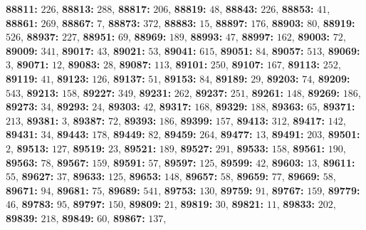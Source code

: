 \textsf{\bfseries 88811:} $226$, \textsf{\bfseries 88813:} $288$, \textsf{\bfseries 88817:} $206$, \textsf{\bfseries 88819:} $48$, \textsf{\bfseries 88843:} $226$, \textsf{\bfseries 88853:} $41$, \textsf{\bfseries 88861:} $269$, \textsf{\bfseries 88867:} $7$, \textsf{\bfseries 88873:} $372$, \textsf{\bfseries 88883:} $15$, \textsf{\bfseries 88897:} $176$, \textsf{\bfseries 88903:} $80$, \textsf{\bfseries 88919:} $526$, \textsf{\bfseries 88937:} $227$, \textsf{\bfseries 88951:} $69$, \textsf{\bfseries 88969:} $189$, \textsf{\bfseries 88993:} $47$, \textsf{\bfseries 88997:} $162$, \textsf{\bfseries 89003:} $72$, \textsf{\bfseries 89009:} $341$, \textsf{\bfseries 89017:} $43$, \textsf{\bfseries 89021:} $53$, \textsf{\bfseries 89041:} $615$, \textsf{\bfseries 89051:} $84$, \textsf{\bfseries 89057:} $513$, \textsf{\bfseries 89069:} $3$, \textsf{\bfseries 89071:} $12$, \textsf{\bfseries 89083:} $28$, \textsf{\bfseries 89087:} $113$, \textsf{\bfseries 89101:} $250$, \textsf{\bfseries 89107:} $167$, \textsf{\bfseries 89113:} $252$, \textsf{\bfseries 89119:} $41$, \textsf{\bfseries 89123:} $126$, \textsf{\bfseries 89137:} $51$, \textsf{\bfseries 89153:} $84$, \textsf{\bfseries 89189:} $29$, \textsf{\bfseries 89203:} $74$, \textsf{\bfseries 89209:} $543$, \textsf{\bfseries 89213:} $158$, \textsf{\bfseries 89227:} $349$, \textsf{\bfseries 89231:} $262$, \textsf{\bfseries 89237:} $251$, \textsf{\bfseries 89261:} $148$, \textsf{\bfseries 89269:} $186$, \textsf{\bfseries 89273:} $34$, \textsf{\bfseries 89293:} $24$, \textsf{\bfseries 89303:} $42$, \textsf{\bfseries 89317:} $168$, \textsf{\bfseries 89329:} $188$, \textsf{\bfseries 89363:} $65$, \textsf{\bfseries 89371:} $213$, \textsf{\bfseries 89381:} $3$, \textsf{\bfseries 89387:} $72$, \textsf{\bfseries 89393:} $186$, \textsf{\bfseries 89399:} $157$, \textsf{\bfseries 89413:} $312$, \textsf{\bfseries 89417:} $142$, \textsf{\bfseries 89431:} $34$, \textsf{\bfseries 89443:} $178$, \textsf{\bfseries 89449:} $82$, \textsf{\bfseries 89459:} $264$, \textsf{\bfseries 89477:} $13$, \textsf{\bfseries 89491:} $203$, \textsf{\bfseries 89501:} $2$, \textsf{\bfseries 89513:} $127$, \textsf{\bfseries 89519:} $23$, \textsf{\bfseries 89521:} $189$, \textsf{\bfseries 89527:} $291$, \textsf{\bfseries 89533:} $158$, \textsf{\bfseries 89561:} $190$, \textsf{\bfseries 89563:} $78$, \textsf{\bfseries 89567:} $159$, \textsf{\bfseries 89591:} $57$, \textsf{\bfseries 89597:} $125$, \textsf{\bfseries 89599:} $42$, \textsf{\bfseries 89603:} $13$, \textsf{\bfseries 89611:} $55$, \textsf{\bfseries 89627:} $37$, \textsf{\bfseries 89633:} $125$, \textsf{\bfseries 89653:} $148$, \textsf{\bfseries 89657:} $58$, \textsf{\bfseries 89659:} $77$, \textsf{\bfseries 89669:} $58$, \textsf{\bfseries 89671:} $94$, \textsf{\bfseries 89681:} $75$, \textsf{\bfseries 89689:} $541$, \textsf{\bfseries 89753:} $130$, \textsf{\bfseries 89759:} $91$, \textsf{\bfseries 89767:} $159$, \textsf{\bfseries 89779:} $46$, \textsf{\bfseries 89783:} $95$, \textsf{\bfseries 89797:} $150$, \textsf{\bfseries 89809:} $21$, \textsf{\bfseries 89819:} $30$, \textsf{\bfseries 89821:} $11$, \textsf{\bfseries 89833:} $202$, \textsf{\bfseries 89839:} $218$, \textsf{\bfseries 89849:} $60$, \textsf{\bfseries 89867:} $137$, 
